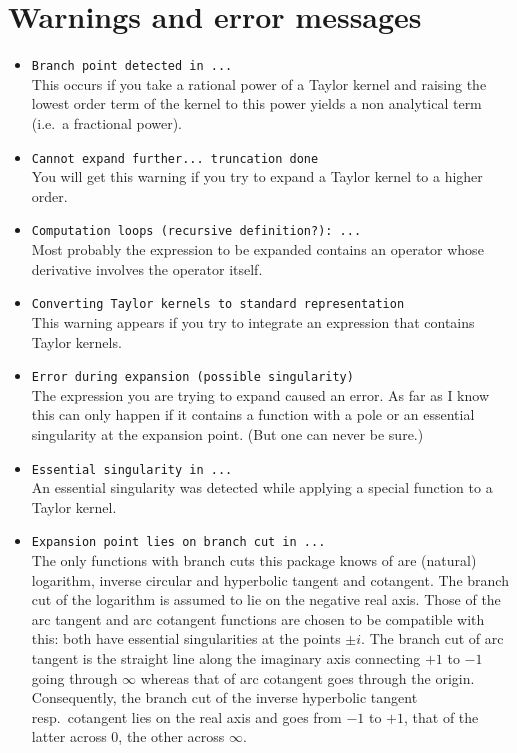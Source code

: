\section{Warnings and error messages}
\begin{itemize}

\item \verb|Branch point detected in ...|\\
    This occurs if you take a rational power of a Taylor kernel
    and raising the lowest order term of the kernel to this
    power yields a non analytical term (i.e.\ a fractional power).

\item \verb|Cannot expand further... truncation done|\\
    You will get this warning if you try to expand a Taylor kernel to
    a higher order.

\item \verb|Computation loops (recursive definition?): ...|\\
    Most probably the expression to be expanded contains an operator
    whose derivative involves the operator itself.

\item \verb|Converting Taylor kernels to standard representation|\\
    This warning appears if you try to integrate an expression that
    contains Taylor kernels.

\item \verb|Error during expansion (possible singularity)|\\
    The expression you are trying to expand caused an error.
    As far as I know this can only happen if it contains a function
    with a pole or an essential singularity at the expansion point.
    (But one can never be sure.)

\item \verb|Essential singularity in ...|\\
    An essential singularity was detected while applying a
    special function to a Taylor kernel.

\item \verb|Expansion point lies on branch cut in ...|\\
    The only functions with branch cuts this package knows of are
    (natural) logarithm, inverse circular and hyperbolic tangent and
    cotangent.  The branch cut of the logarithm is assumed to lie on
    the negative real axis.  Those of the arc tangent and arc
    cotangent functions are chosen to be compatible with this: both
    have essential singularities at the points $\pm i$.  The branch
    cut of arc tangent is the straight line along the imaginary axis
    connecting $+1$ to $-1$ going through $\infty$ whereas that of arc
    cotangent goes through the origin.  Consequently, the branch cut
    of the inverse hyperbolic tangent resp.\ cotangent lies on the
    real axis and goes from $-1$ to $+1$, that of the latter across
    $0$, the other across $\infty$.


\end{itemize}
